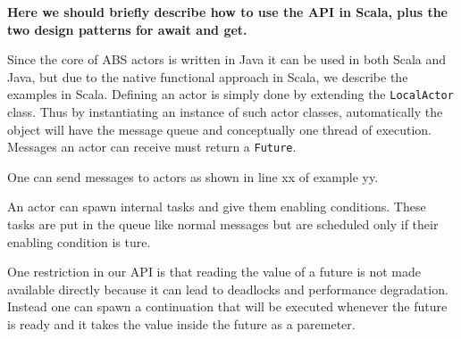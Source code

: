 \newcommand{\future}{\lstinline{Future}}

{\bf Here we should briefly describe how to use the API in Scala, plus the two design patterns for await and get.}

Since the core of ABS actors is written in Java it can be used in both Scala and Java, but due to the native functional approach in Scala, we describe the examples in Scala.
Defining an actor is simply done by extending the \lstinline{LocalActor} class. Thus by instantiating an instance of such actor classes, automatically the object will have the message queue and conceptually one thread of execution. Messages an actor can receive must return a \future. 

One can send messages to actors as shown in line xx of example yy.

An actor can spawn internal tasks and give them enabling conditions. These tasks are put in the queue like normal messages but are scheduled only if their enabling condition is ture.

One restriction in our API is that reading the value of a future is not made available directly because it can lead to deadlocks and performance degradation. Instead one can spawn a continuation that will be executed whenever the future is ready and it takes the value inside the future as a paremeter.







